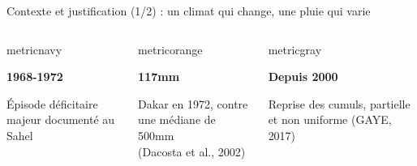 \documentclass[aspectratio=169,11pt]{beamer}
\begin{document}
\begin{frame}{Contexte et justification (1/2) : un climat qui change, une pluie qui varie}
\begin{columns}[T,onlytextwidth]
      \begin{beamercolorbox}[wd=\linewidth,rounded=true,sep=0.10cm,center]{metricnavy}
        {\Large\bfseries 1968-1972\par}
        {\small Épisode déficitaire majeur documenté au Sahel}
      \end{beamercolorbox}
      \vspace{0.12cm}
      \begin{beamercolorbox}[wd=\linewidth,rounded=true,sep=0.10cm,center]{metricorange}
        {\Large\bfseries 117mm\par}
        {\small Dakar en 1972, contre une médiane de 500mm\\(Dacosta et al., 2002)}
      \end{beamercolorbox}
      \vspace{0.12cm}
      \begin{beamercolorbox}[wd=\linewidth,rounded=true,sep=0.10cm,center]{metricgray}
        {\Large\bfseries Depuis 2000\par}
        {\small Reprise des cumuls, partielle et non uniforme (GAYE, 2017)}
      \end{beamercolorbox}
  \end{columns}
\end{frame}
\end{document}
